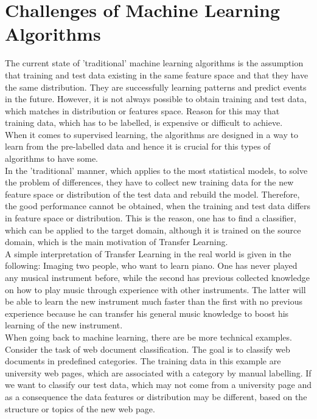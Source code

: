 \section{Challenges of Machine Learning Algorithms}\label{TlSecChal}
The current state of 'traditional' machine learning algorithms is the assumption that training and test data existing in the same feature space and that they have the same distribution.
They are successfully learning patterns and predict events in the future.
However, it is not always possible to obtain training and test data, which matches in distribution or features space.
Reason for this may that training data, which has to be labelled, is expensive or difficult to achieve.\cite[p. 1]{Weiss.2016}\\
When it comes to supervised learning, the algorithms are designed in a way to learn from the pre-labelled data and hence it is crucial for this types of algorithms to have some.\cite[p. 6-7]{Theodoridis.2008}\\
In the 'traditional' manner, which applies to the most statistical models, to solve the problem of differences, they have to collect new training data for the new feature space or distribution of the test data and rebuild the model.\cite{Pan.2010}
Therefore, the good performance cannot be obtained, when the training and test data differs in feature space or distribution.
This is the reason, one has to find a classifier, which can be applied to the target domain, although it is trained on the source domain, which is the main motivation of Transfer Learning.\cite[p. 1.]{Weiss.2016}\\
A simple interpretation of Transfer Learning in the real world is given in the following:
Imaging two people, who want to learn piano.
One has never played any musical instrument before, while the second has previous collected knowledge on how to play music through experience with other instruments.
The latter will be able to learn the new instrument much faster than the first with no previous experience because he can transfer his general music knowledge to boost his learning of the new instrument.\cite[p. 1]{Weiss.2016}\\
When going back to machine learning, there are be more technical examples.
Consider the task of web document classification.
The goal is to classify web documents in predefined categories.
The training data in this example are university web pages, which are associated with a category by manual labelling.
If we want to classify our test data, which may not come from a university page and as a consequence the data features or distribution may be different, based on the structure or topics of the new web page.
